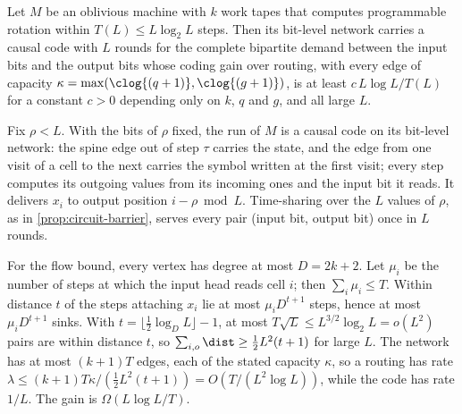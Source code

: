\begin{proposition}\label{prop:rotation-barrier}
\notformalized
Let $M$ be an oblivious machine with $k$ work tapes that computes programmable rotation within $T(L)\le
L\log_2L$ steps. Then its bit-level network carries a causal code with $L$ rounds for the complete
bipartite demand between the input bits and the output bits whose coding gain over routing, with every edge
of capacity $\kappa=\max(\clog{(q+1)},\clog{(g+1)})$, is at least $c\,L\log L/T(L)$ for a constant $c>0$
depending only on $k$, $q$ and $g$, and all large $L$.
\end{proposition}

\begin{informalproof}
Fix $\rho<L$. With the bits of $\rho$ fixed, the run of $M$ is a causal code on its bit-level network: the spine
edge out of step $\tau$ carries the state, and the edge from one visit of a cell to the next carries the
symbol written at the first visit; every step computes its outgoing values from its incoming ones and the
input bit it reads. It delivers $x_i$ to output position $i-\rho\bmod L$. Time-sharing over the $L$ values of $\rho$, as in
\cref{prop:circuit-barrier}, serves every pair (input bit, output bit) once in $L$ rounds.

For the flow bound, every vertex has degree at most $D=2k+2$. Let $\mu_i$ be the number of steps at which
the input head reads cell $i$; then $\sum_i\mu_i\le T$. Within distance $t$ of the steps attaching $x_i$
lie at most $\mu_iD^{t+1}$ steps, hence at most $\mu_iD^{t+1}$ sinks. With
$t=\lfloor\tfrac12\log_DL\rfloor-1$, at most $T\sqrt L\le L^{3/2}\log_2L=o(L^2)$ pairs are within distance
$t$, so $\sum_{i,o}\dist\ge\tfrac12L^2(t+1)$ for large $L$. The network has at most $(k+1)T$ edges, each of
the stated capacity $\kappa$, so a routing has rate $\lambda\le(k+1)T\kappa/(\tfrac12L^2(t+1))=O(T/(L^2\log L))$,
while the code has rate $1/L$. The gain is $\Omega(L\log L/T)$.
\end{informalproof}

